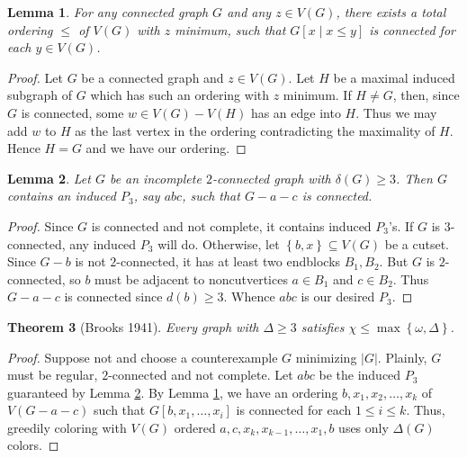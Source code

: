 \documentclass[12pt]{amsart}
\theoremstyle{plain}
\newtheorem{thm}{Theorem}
\newtheorem{lem}[thm]{Lemma}
\theoremstyle{definition}
\theoremstyle{remark}
\newcommand{\set}[1]{\left\{ #1 \right\}}
\newcommand{\card}[1]{\left|#1\right|}
\begin{document}
\begin{lem}\label{OrderingLemma}
For any connected graph $G$ and any $z \in V(G)$, there exists a total ordering $\leq$ of $V(G)$ with $z$ minimum, such that $G\left[x \mid x \leq y\right]$ is connected for each $y \in V(G)$.
\end{lem}
\begin{proof}
Let $G$ be a connected graph and $z \in V(G)$.  Let $H$ be a maximal induced subgraph of $G$ which has such an ordering with $z$ minimum.  If $H \neq G$, then, since $G$ is connected, some $w \in V(G) - V(H)$ has an edge into $H$. Thus we may add $w$ to $H$ as the last vertex in the ordering contradicting the maximality of $H$.  Hence $H = G$ and we have our ordering.
\end{proof}

\begin{lem}\label{TwoConnectedHasGoodP3}
Let $G$ be an incomplete $2$-connected graph with $\delta(G) \geq 3$. Then $G$ contains an induced $P_3$, say $abc$, such that $G - a - c$ is connected.
\end{lem}
\begin{proof}
Since $G$ is connected and not complete, it contains induced $P_3$'s. If $G$ is $3$-connected, any induced $P_3$ will do.  Otherwise, let $\set{b, x} \subseteq V(G)$ be a cutset.  Since $G - b$ is not $2$-connected, it has at least two endblocks $B_1, B_2$.  But $G$ is $2$-connected, so $b$ must be adjacent to 
noncutvertices $a \in B_1$ and $c \in B_2$.  Thus $G - a - c$ is connected since $d(b) \geq 3$.  Whence $abc$ is our desired $P_3$.
\end{proof}

\begin{thm}[Brooks 1941]
Every graph with $\Delta \geq 3$ satisfies $\chi \leq \max\set{\omega, \Delta}$.
\end{thm}
\begin{proof}
Suppose not and choose a counterexample $G$ minimizing $\card{G}$.  Plainly, $G$ must be regular, $2$-connected and not complete.  Let $abc$ be the induced $P_3$ guaranteed by Lemma \ref{TwoConnectedHasGoodP3}.  By Lemma \ref{OrderingLemma}, we have an ordering $b, x_1, x_2, \ldots, x_k$ of $V(G - a - c)$ such that $G\left[b, x_1 ,\ldots, x_i\right]$ is connected for each $1 \leq i \leq k$.  Thus, greedily coloring with $V(G)$ ordered $a, c, x_k, x_{k-1}, \ldots, x_1, b$ uses only $\Delta(G)$ colors.
\end{proof}
\end{document}
